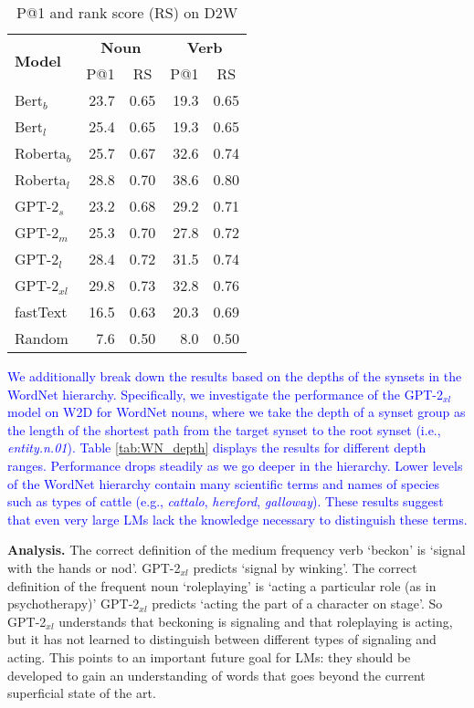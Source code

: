 \documentclass[11pt,a4paper]{article}
\begin{document}
\begin{table}
    \centering
    \begin{tabular}{l|rrrr}
        \hline
         \multirow{2}{*}{\textbf{Model}} & \multicolumn{2}{c}{\textbf{Noun}} & \multicolumn{2}{c}{\textbf{Verb}} \\
         & \multicolumn{1}{c}{P@1} & \multicolumn{1}{c}{RS} & \multicolumn{1}{c}{P@1} & \multicolumn{1}{c}{RS} \\ \hline
     Bert$_{b}$ & 23.7 & 0.65 & 19.3 & 0.65 \\
     Bert$_{l}$ & 25.4 & 0.65 & 19.3 & 0.65 \\
     Roberta$_{b}$ & 25.7 & 0.67 & 32.6 & 0.74 \\
     Roberta$_{l}$ & 28.8 & 0.70 & 38.6 & 0.80 \\ \hline
     GPT-2$_{s}$ & 23.2 & 0.68 & 29.2 & 0.71 \\
     GPT-2$_{m}$ & 25.3 & 0.70 & 27.8 & 0.72 \\
     GPT-2$_{l}$ & 28.4 & 0.72 & 31.5 & 0.74 \\
     GPT-2$_{xl}$ & 29.8 & 0.73 & 32.8 & 0.76 \\ \hline 
     fastText & 16.5 & 0.63 & 20.3 & 0.69 \\ \hline 
     Random & 7.6 & 0.50 & 8.0 & 0.50 \\\hline
     
    \end{tabular}
    \caption{P@1 and rank score (RS) on D2W}
    \label{tab:results_D2W}
\end{table}

\textcolor{blue}{We additionally break down the results
  based on the depths of the synsets in the WordNet
  hierarchy. Specifically, we investigate the performance of
  the GPT-2$_{xl}$ model on W2D for WordNet nouns, where we
  take the depth of a synset group as the length of the
  shortest path from the target synset to the root synset
  (i.e., \textit{entity.n.01}). Table \ref{tab:WN_depth}
  displays the results for different depth
  ranges. Performance drops steadily as we go deeper in the
  hierarchy. Lower levels of the WordNet hierarchy contain
  many scientific terms and names of species such as types
  of cattle (e.g., \textit{cattalo},
  \textit{hereford}, \textit{galloway}). These results suggest that even very large LMs
  lack the knowledge necessary to distinguish these terms.}

\textbf{Analysis.}
The correct definition of the medium frequency verb `beckon' is  `signal with the hands or nod'. GPT-2$_{xl}$ predicts  `signal by winking'.
The correct definition of the frequent noun `roleplaying' is `acting a particular role (as in psychotherapy)' GPT-2$_{xl}$ predicts `acting the part of a character on stage'.
So GPT-2$_{xl}$ understands that beckoning is signaling and that roleplaying is acting, but it has not learned to distinguish between different types of signaling and acting.
This points to an important future goal for LMs: they should be developed to gain an understanding of words that goes beyond the current superficial state of the art.
\end{document}

